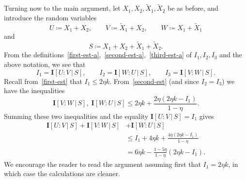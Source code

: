 \documentclass[12pt,reqno,tbtags]{amsart}
\theoremstyle{definition}
\theoremstyle{remark}
\renewcommand{\leq}{\leqslant}
\newcommand{\I}[1]{\mathbf{I}[#1]}
\numberwithin{equation}{section}
\begin{document}
Turning now to the main argument, let $X_1,X_2,\tilde X_1,\tilde X_2$ be as before, and introduce the random variables
\[ U \coloneqq X_1 + X_2, \qquad V \coloneqq \tilde X_1 + X_2, \qquad W \coloneqq X_1 + \tilde X_1\] and
\[   S \coloneqq X_1 + X_2 + \tilde X_1 + \tilde X_2.\]
From the definitions~\eqref{first-est-a},~\eqref{second-est-a},~\eqref{third-est-a} of $I_1, I_2, I_3$ and the above notation, we see that
\[
  I_1 = \I{U : V \, | \, S}, \qquad I_2 = \I{W : U \, | \, S}, \qquad I_3 = \I{V : W \, | \,S}.
\]
Recall from~\eqref{first-est} that $I_1 \leq 2 \eta k$. From~\eqref{second-est} (and since $I_2 = I_3$) we have the inequalities
\[   \I{V : W \, | \,S} , \;  \I{W : U \, | \, S} \leq 2 \eta k + \frac{2\eta(2 \eta k - I_1)}{1-\eta} .
\]
Summing these two inequalities and the equality $\I{U : V \, | \, S} = I_1$ gives
\begin{align}
  \nonumber
   \label{uvw-s} \I{U : V \, | \, S} + \I{V : W \, | \,S} &+ \I{W : U \, | \, S}\\
   \nonumber
   &\leq I_1+4\eta k+ \frac{4\eta(2 \eta k - I_1)}{1-\eta}\\
  &= 6 \eta k - \frac{1 - 5 \eta}{1-\eta} (2 \eta k - I_1).
\end{align}
We encourage the reader to read the argument assuming first that $I_1 = 2 \eta k$, in which case the calculations are cleaner.
\end{document}
